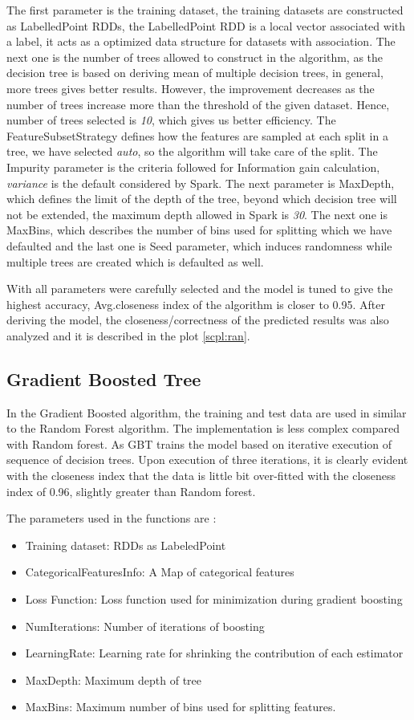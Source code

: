 \documentclass[sigconf]{acmart}
\begin{document}
The first parameter is the training dataset, the training datasets are constructed as LabelledPoint RDDs, the LabelledPoint RDD is a local vector associated with a label, it acts as a optimized data structure for datasets with association. The next one is the number of trees allowed to construct in the algorithm, as the decision tree is based on deriving mean of multiple decision trees, in general, more trees gives better results. However, the improvement decreases as the number of trees increase more than the threshold of the given dataset. Hence, number of trees selected is {\em 10}, which gives us better efficiency. The FeatureSubsetStrategy defines how the features are sampled at each split in a tree, we have selected {\em auto}, so the algorithm will take care of the split. The Impurity parameter is the criteria followed for Information gain calculation, {\em variance} is the default considered by Spark. The next parameter is MaxDepth, which defines the limit of the depth of the tree, beyond which decision tree will not be extended, the maximum depth allowed in Spark is {\em 30}. The next one is MaxBins, which describes the number of bins used for splitting which we have defaulted and the last one is Seed parameter, which induces randomness while multiple trees are created which is defaulted as well.

With all parameters were carefully selected and the model is tuned to give the highest accuracy, Avg.closeness index of the algorithm is closer to 0.95. After deriving the model, the closeness/correctness of the predicted results was also analyzed and it is described in the plot \ref{scpl:ran}.

\subsection{Gradient Boosted Tree}
In the Gradient Boosted algorithm, the training and test data are used in similar to the Random Forest algorithm. The implementation is less complex compared with Random forest. As GBT trains the model based on iterative execution of sequence of decision trees. Upon execution of three iterations, it is clearly evident with the closeness index that the data is little bit over-fitted with the closeness index of 0.96, slightly greater than Random forest.

The parameters used in the functions are \cite{api:docs} : 
\begin{itemize}
\item Training dataset: RDDs as LabeledPoint
\item CategoricalFeaturesInfo: A Map of categorical features
\item Loss Function: Loss function used for minimization during gradient boosting
\item NumIterations: Number of iterations of boosting
\item LearningRate: Learning rate for shrinking the contribution of each estimator
\item MaxDepth: Maximum depth of tree 
\item MaxBins: Maximum number of bins used for splitting features.
\end{itemize}
\end{document}
